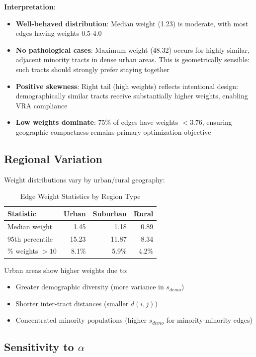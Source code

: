 \textbf{Interpretation}:
\begin{itemize}
\item \textbf{Well-behaved distribution}: Median weight (1.23) is moderate, with most edges having weights 0.5-4.0
\item \textbf{No pathological cases}: Maximum weight (48.32) occurs for highly similar, adjacent minority tracts in dense urban areas. This is geometrically sensible: such tracts should strongly prefer staying together
\item \textbf{Positive skewness}: Right tail (high weights) reflects intentional design: demographically similar tracts receive substantially higher weights, enabling VRA compliance
\item \textbf{Low weights dominate}: 75\% of edges have weights $< 3.76$, ensuring geographic compactness remains primary optimization objective
\end{itemize}

\subsection{Regional Variation}

Weight distributions vary by urban/rural geography:

\begin{table}[h]
\centering
\caption{Edge Weight Statistics by Region Type}
\begin{tabular}{lrrr}
\toprule
\textbf{Statistic} & \textbf{Urban} & \textbf{Suburban} & \textbf{Rural} \\
\midrule
Median weight & 1.45 & 1.18 & 0.89 \\
95th percentile & 15.23 & 11.87 & 8.34 \\
\% weights $> 10$ & 8.1\% & 5.9\% & 4.2\% \\
\bottomrule
\end{tabular}
\end{table}

Urban areas show higher weights due to:
\begin{itemize}
\item Greater demographic diversity (more variance in $s_{demo}$)
\item Shorter inter-tract distances (smaller $d(i,j)$)
\item Concentrated minority populations (higher $s_{demo}$ for minority-minority edges)
\end{itemize}

\subsection{Sensitivity to $\alpha$}

